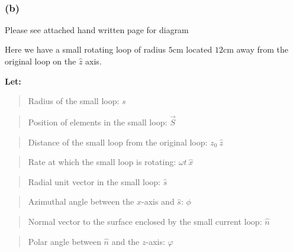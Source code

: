 \documentclass[11pt]{article}
\begin{document}
    \begin{center}
    \end{center}
    { \hspace*{\fill} \\}
    
    \newpage

\hypertarget{b}{%
\subsubsection{(b)}\label{b}}

Please see attached hand written page for diagram

Here we have a small rotating loop of radius \(5\)cm located \(12\)cm
away from the original loop on the \(\hat{z}\) axis.

\textbf{Let:}

\begin{quote}
Radius of the small loop: \(s\)
\end{quote}

\begin{quote}
Position of elements in the small loop: \(\vec{S}\)
\end{quote}

\begin{quote}
Distance of the small loop from the original loop: \(z_0 \ \hat{z}\)
\end{quote}

\begin{quote}
Rate at which the small loop is rotating: \(\omega t \ \hat{x}\)
\end{quote}

\begin{quote}
Radial unit vector in the small loop: \(\hat{s}\)
\end{quote}

\begin{quote}
Azimuthal angle between the \(x\)-axis and \(\hat{s}\): \(\phi\)
\end{quote}

\begin{quote}
Normal vector to the surface enclosed by the small current loop:
\(\hat{n}\)
\end{quote}

\begin{quote}
Polar angle between \(\hat{n}\) and the \(z\)-axis: \(\varphi\)
\end{quote}
\end{document}
